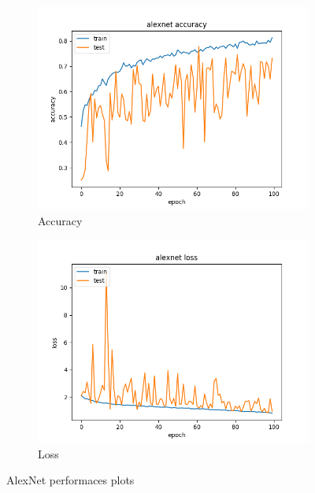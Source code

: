\documentclass[11pt]{article}
\begin{document}
\begin{figure}[H]
	\centering
	\begin{subfigure}[b]{0.4\linewidth}
		\includegraphics[width=\linewidth]{../images/alexnet_100_epochs_accuracy.png}
		\caption{Accuracy}
	\end{subfigure}
	\begin{subfigure}[b]{0.4\linewidth}
		\includegraphics[width=\linewidth]{../images/alexnet_100_epochs_loss.png}
		\caption{Loss}
	\end{subfigure}
	\caption{AlexNet performaces plots}
	\label{fig:alexnetperformances}
\end{figure}
\end{document}
